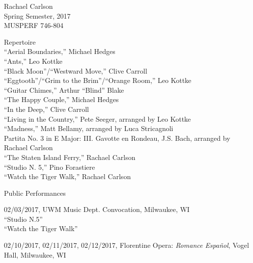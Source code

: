 \documentclass[12pt]{article}
\begin{document}
\begin{flushleft}
  Rachael Carlson\\
  Spring Semester, 2017\\
  MUSPERF 746-804\\

  \vspace{.15in}

  Repertoire\\

  \vspace{.15in}
  ``Aerial Boundaries,'' Michael Hedges\\
  ``Ants,'' Leo Kottke\\
  ``Black Moon''/``Westward Move,'' Clive Carroll\\
  ``Eggtooth''/``Grim to the Brim''/``Orange Room,'' Leo Kottke\\
  ``Guitar Chimes,'' Arthur ``Blind'' Blake\\
  ``The Happy Couple,'' Michael Hedges\\
  ``In the Deep,'' Clive Carroll\\
  ``Living in the Country,'' Pete Seeger, arranged by Leo Kottke\\
  ``Madness,'' Matt Bellamy, arranged by Luca Stricagnoli\\
  Partita No. 3 in E Major: III. Gavotte en Rondeau, J.S. Bach, arranged by
  Rachael Carlson\\
  ``The Staten Island Ferry,'' Rachael Carlson\\
  ``Studio N. 5,'' Pino Forastiere\\
  ``Watch the Tiger Walk,'' Rachael Carlson\\

  \vspace{.15in}

  Public Performances\\

  \vspace{.15in}

  02/03/2017, UWM Music Dept. Convocation, Milwaukee, WI\\
  \hspace{.25in}``Studio N.5''\\
  \hspace{.25in}``Watch the Tiger Walk''\\

  \vspace{.15in}

  02/10/2017, 02/11/2017, 02/12/2017, Florentine Opera: \emph{Romance Español}, Vogel Hall, Milwaukee, WI\\


\end{flushleft}
\end{document}
